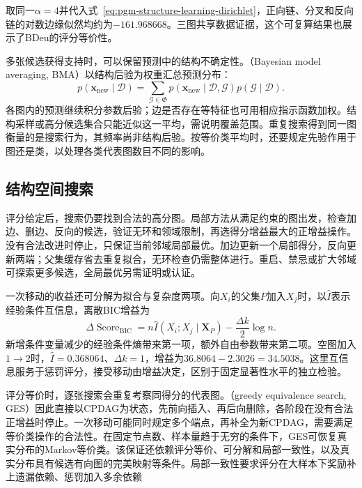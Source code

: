 取同一$\alpha=4$并代入式~\eqref{eq:pgm-structure-learning-dirichlet}，正向链、分叉和反向链的对数边缘似然均约为$-161.968668$。三图共享数据证据，这个可复算结果也展示了BDeu的评分等价性。

多张候选获得支持时，可以保留预测中的结构不确定性。（Bayesian model averaging, BMA）以结构后验为权重汇总预测分布：
\[
  p(\bm{x}_{\mathrm{new}}\mid\mathcal{D})
  =\sum_{\mathcal{G}\in\mathfrak{G}}
    p(\bm{x}_{\mathrm{new}}\mid\mathcal{D},\mathcal{G})
    p(\mathcal{G}\mid\mathcal{D}).
\]
各图内的预测继续积分参数后验；边是否存在等特征也可用相应指示函数加权。结构采样或高分候选集合只能近似这一平均，需说明覆盖范围。重复搜索得到同一图衡量的是搜索行为，其频率尚非结构后验。按等价类平均时，还要规定先验作用于图还是类，以处理各类代表图数目不同的影响。

\subsection{结构空间搜索}
\label{sec:pgm-structure-learning-search}

评分给定后，搜索仍要找到合法的高分图。局部方法从满足约束的图出发，检查加边、删边、反向的候选，验证无环和领域限制，再选得分增益最大的正增益操作。没有合法改进时停止，只保证当前邻域局部最优。加边更新一个局部得分，反向更新两端；父集缓存省去重复拟合，无环检查仍需整体进行。重启、禁忌或扩大邻域可探索更多候选，全局最优另需证明或认证。

一次移动的收益还可分解为拟合与复杂度两项。向$X_i$的父集$P$加入$X_j$时，以$\widehat I$表示经验条件互信息，离散BIC增益为
\begin{equation}
  \Delta\operatorname{Score}_{\mathrm{BIC}}
  =n\widehat I(X_i;X_j\mid\bm{X}_P)
   -\frac{\Delta k}{2}\log n.
  \label{eq:pgm-structure-learning-score-gain}
\end{equation}
新增条件变量减少的经验条件熵带来第一项，额外自由参数带来第二项。空图加入$1\to2$时，$\widehat I=0.368064$、$\Delta k=1$，增益为$36.8064-2.3026=34.5038$。这里互信息服务于惩罚评分，接受移动由增益决定，区别于固定显著性水平的独立检验。

评分等价时，逐张搜索会重复考察同得分的代表图。（greedy equivalence search, GES）因此直接以CPDAG为状态，先前向插入、再后向删除，各阶段在没有合法正增益时停止。一次移动可能同时规定多个端点，再补全为新CPDAG，需要满足等价类操作的合法性。在固定节点数、样本量趋于无穷的条件下，GES可恢复真实分布的Markov等价类。该保证还依赖评分等价、可分解和局部一致性，以及真实分布具有候选有向图的完美映射等条件。局部一致性要求评分在大样本下奖励补上遗漏依赖、惩罚加入多余依赖

